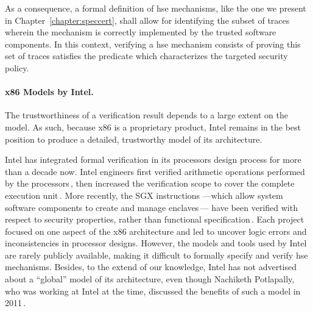 As a consequence, a formal definition of \ac{hse} mechanisms, like the one we
present in Chapter~\ref{chapter:speccert}, shall allow for identifying the
subset of traces wherein the mechanism is correctly implemented by the trusted
software components.
%
In this context, verifying a \ac{hse} mechanism consists of proving this set of
traces satisfies the predicate which characterizes the targeted security policy.


\paragraph{x86 Models by Intel.}
%
The trustworthiness of a verification result depends to a large extent on the
model.
%
As such, because x86 is a proprietary product, Intel remains in the best
position to produce a detailed, trustworthy model of its architecture. 

Intel has integrated formal verification in its processors design process for
more than a decade now.
%
Intel engineers first verified arithmetic operations performed by the
processors\,\cite{harrison2000x86}, then increased the verification scope to
cover the complete execution unit\,\cite{kaivola2009formalintel}.
%
More recently, the SGX instructions ---which allow system software components to
create and manage enclaves\,\cite{costan2016sgxexplained}--- have been verified
with respect to security properties, rather than functional
specification\,\cite{leslie2015linsgx}.
%
Each project focused on one aspect of the x86 architecture and led to uncover
logic errors and inconsistencies in processor designs.
%
However, the models and tools used by Intel are rarely publicly available, making it difficult to
formally specify and verify \ac{hse} mechanisms. 
%
Besides, to the extend of our knowledge, Intel has not advertised about a
``global'' model of its architecture, even though Nachiketh Potlapally, who was
working at Intel at the time, discussed the benefits of such a model in
2011\,\cite{potlapally2011hardwaresecurity}. 

